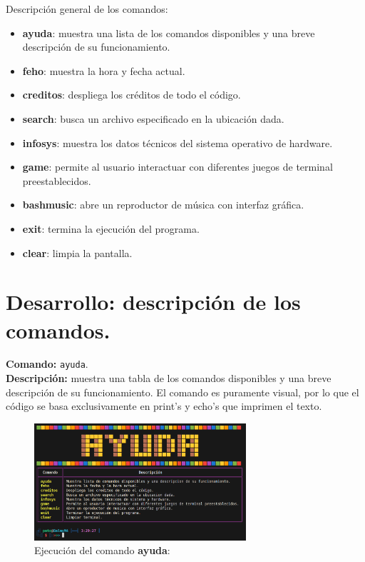 \documentclass[titlepage]{article}
\begin{document}
Descripción general de los comandos:
\begin{itemize}
\item \textbf{ayuda}: muestra una lista de los comandos disponibles y una breve descripción de su funcionamiento.                        
\item \textbf{feho}: muestra la hora y fecha actual.
\item \textbf{creditos}: despliega los créditos de todo el código. 
\item \textbf{search}: busca un archivo especificado en la ubicación dada. 
\item \textbf{infosys}: muestra los datos técnicos del sistema operativo de hardware. 
\item \textbf{game}: permite al usuario interactuar con diferentes juegos de terminal preestablecidos.               
\item \textbf{bashmusic}: abre un reproductor de música con interfaz gráfica.           
\item \textbf{exit}: termina la ejecución del programa.     
\item \textbf{clear}: limpia la pantalla. 
\end{itemize}

\newpage
\section{Desarrollo: descripción de los comandos.}

\noindent
\textbf{Comando:} \verb|ayuda|. \\
\textbf{Descripción:} muestra una tabla de los comandos disponibles y una breve descripción de su funcionamiento. El comando es puramente visual, por lo que el código se basa exclusivamente en print's y echo's que imprimen el texto.

\begin{figure}[H]
    \centering
    \includegraphics[width=0.7\textwidth]{ayuda.png}
    \caption{Ejecución del comando \textbf{ayuda}:}
    \label{fig:ejemplo}
\end{figure}
\end{document}
